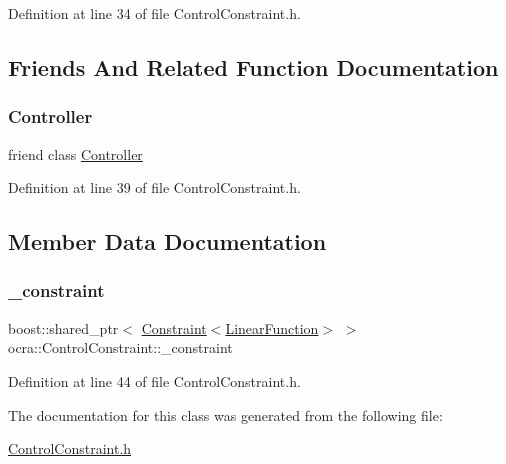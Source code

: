 Definition at line 34 of file Control\+Constraint.\+h.



\subsection{Friends And Related Function Documentation}
\hypertarget{classocra_1_1ControlConstraint_ac3456fd331a58b288082abca310c7a99}{}\label{classocra_1_1ControlConstraint_ac3456fd331a58b288082abca310c7a99} 
\subsubsection{\texorpdfstring{Controller}{Controller}}
{\footnotesize\ttfamily friend class \hyperlink{classocra_1_1Controller}{Controller}\hspace{0.3cm}{\ttfamily [friend]}}



Definition at line 39 of file Control\+Constraint.\+h.



\subsection{Member Data Documentation}
\hypertarget{classocra_1_1ControlConstraint_a47cebded91be870b03e1dddc7b0c215b}{}\label{classocra_1_1ControlConstraint_a47cebded91be870b03e1dddc7b0c215b} 
\subsubsection{\texorpdfstring{\+\_\+constraint}{\_constraint}}
{\footnotesize\ttfamily boost\+::shared\+\_\+ptr$<$ \hyperlink{classocra_1_1Constraint}{Constraint}$<$\hyperlink{classocra_1_1LinearFunction}{Linear\+Function}$>$ $>$ ocra\+::\+Control\+Constraint\+::\+\_\+constraint\hspace{0.3cm}{\ttfamily [protected]}}



Definition at line 44 of file Control\+Constraint.\+h.



The documentation for this class was generated from the following file\+:\begin{DoxyCompactItemize}
\item 
\hyperlink{ControlConstraint_8h}{Control\+Constraint.\+h}\end{DoxyCompactItemize}
